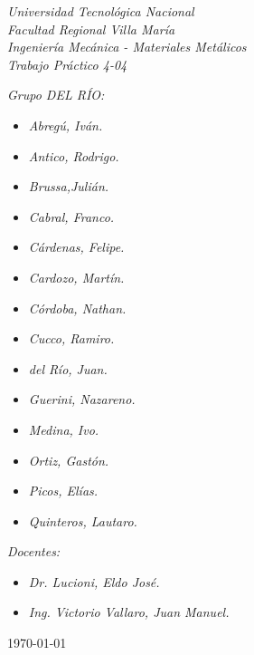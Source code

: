 \begin{titlepage}
	
	\begin{center}
		{\huge \textit{Universidad Tecnológica Nacional}}\\
        \vspace{0.5cm}
		{\LARGE \textit{Facultad Regional Villa María}}\\
		\vspace{1.5cm}
        {\LARGE{\textit{Ingeniería Mecánica - Materiales Metálicos}}}\\
		\vspace{1.5cm}
        \LARGE{\textit{Trabajo Práctico 4-04}}
	\end{center}
	
	\vfill

    \textit{Grupo DEL RÍO:}
	\begin{itemize}
		\item \textit{Abregú, Iván.}
		\item \textit{Antico, Rodrigo.}
		\item \textit{Brussa,Julián.}
		\item \textit{Cabral, Franco.}
        \item \textit{Cárdenas, Felipe.}
        \item \textit{Cardozo, Martín.}
        \item \textit{Córdoba, Nathan.}
        \item \textit{Cucco, Ramiro.}
        \item \textit{del Río, Juan.}
        \item \textit{Guerini, Nazareno.}
        \item \textit{Medina, Ivo.}
        \item \textit{Ortiz, Gastón.}
        \item \textit{Picos, Elías.}
        \item \textit{Quinteros, Lautaro.}
	\end{itemize}
    
	\textit{Docentes:}
	\begin{itemize}
		\item \textit{Dr. Lucioni, Eldo José.}
		\item \textit{Ing. Victorio Vallaro, Juan Manuel.}
	\end{itemize}
	\centering
	\today
	
\end{titlepage}
